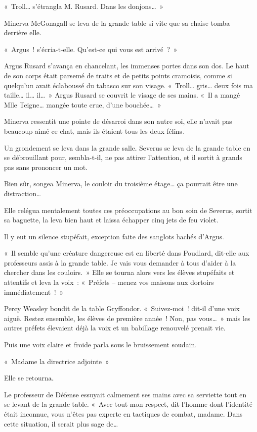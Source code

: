 «~Troll… s'étrangla M. Rusard.
Dans les donjons…~»

Minerva McGonagall se leva de la grande table si vite que sa chaise tomba derrière elle.

«~Argus~! s'écria-t-elle.
Qu'est-ce qui vous est arrivé~?~»

Argus Rusard s'avança en chancelant, les immenses portes dans son dos.
Le haut de son corps était parsemé de traits et de petits points cramoisis, comme si quelqu'un avait éclaboussé du tabasco sur son visage.
«~Troll… gris… deux fois ma taille… il… il…~»
Argus Rusard se couvrit le visage de ses mains.
«~Il a mangé Mlle Teigne… mangée toute crue, d'une bouchée…~»

Minerva ressentit une pointe de désarroi dans son autre soi, elle n'avait pas beaucoup aimé ce chat, mais ils étaient tous les deux félins.

Un grondement se leva dans la grande salle.
Severus se leva de la grande table en se débrouillant pour, sembla-t-il, ne pas attirer l'attention, et il sortit à grands pas sans prononcer un mot.

Bien sûr, songea Minerva, le couloir du troisième étage… ça pourrait être une distraction…

Elle relégua mentalement toutes ces préoccupations au bon soin de Severus, sortit sa baguette, la leva bien haut et laissa échapper cinq jets de feu violet.

Il y eut un silence stupéfait, exception faite des sanglots hachés d'Argus.

«~Il semble qu'une créature dangereuse est en liberté dans Poudlard, dit-elle aux professeurs assis à la grande table.
Je vais vous demander à tous d'aider à la chercher dans les couloirs.~»
Elle se tourna alors vers les élèves stupéfaits et attentifs et leva la voix~: «~Préfets -- menez vos maisons aux dortoirs immédiatement~!~»

Percy Weasley bondit de la table Gryffondor.
«~Suivez-moi~! dit-il d'une voix aiguë.
Restez ensemble, les élèves de première année~!
Non, pas vous…~»
mais les autres préfets élevaient déjà la voix et un babillage renouvelé prenait vie.

Puis une voix claire et froide parla sous le bruissement soudain.

«~Madame la directrice adjointe~»

Elle se retourna.

Le professeur de Défense essuyait calmement ses mains avec sa serviette tout en se levant de la grande table.
«~Avec tout mon respect, dit l'homme dont l'identité était inconnue, vous n'êtes pas experte en tactiques de combat, madame.
Dans cette situation, il serait plus sage de…

